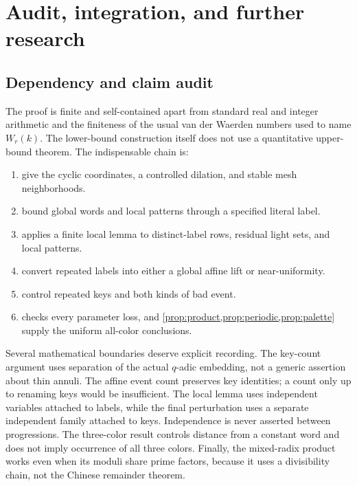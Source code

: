 \section{Audit, integration, and further research}
\label{sec:research}

\subsection{Dependency and claim audit}

The proof is finite and self-contained apart from standard real and
integer arithmetic and the finiteness of the usual van der Waerden
numbers used to name \(W_r(k)\). The lower-bound construction itself
does not use a quantitative upper-bound theorem.
The indispensable chain is:
\begin{enumerate}
 \item {} give the
       cyclic coordinates, a controlled dilation, and stable mesh
       neighborhoods.
 \item {} bound global words and local
       patterns through a specified literal label.
 \item {} applies a finite local lemma to
       distinct-label rows, residual light sets, and local patterns.
 \item {} convert repeated
       labels into either a global affine lift or near-uniformity.
 \item {} control
       repeated keys and both kinds of bad event.
 \item {} checks every parameter loss, and
       \cref{prop:product,prop:periodic,prop:palette} supply the
       uniform all-color conclusions.
\end{enumerate}

Several mathematical boundaries deserve explicit recording.
The key-count argument uses separation of the actual \(q\)-adic
embedding, not a generic assertion about thin annuli.
The affine event count preserves key identities; a count only up to
renaming keys would be insufficient.
The local lemma uses independent variables attached to labels, while
the final perturbation uses a separate independent family attached to
keys. Independence is never asserted between progressions.
The three-color result controls distance from a constant word and
does not imply occurrence of all three colors.
Finally, the mixed-radix product works even when its moduli share
prime factors, because it uses a divisibility chain, not the Chinese
remainder theorem.

